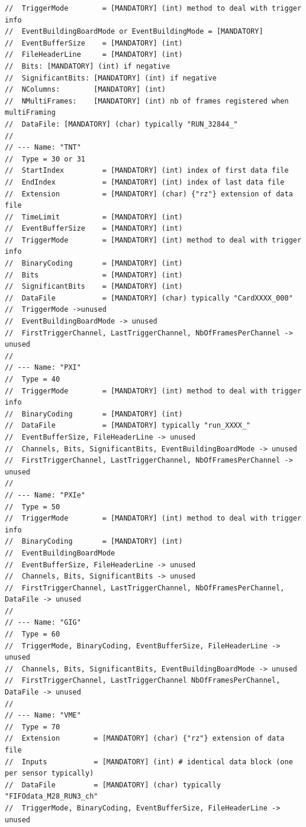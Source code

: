 \documentclass[a4paper, 12pt, twoside]{article}
\begin{document}
\begin{verbatim}
//  TriggerMode        = [MANDATORY] (int) method to deal with trigger info
//  EventBuildingBoardMode or EventBuildingMode = [MANDATORY]
//  EventBufferSize    = [MANDATORY] (int)
//  FileHeaderLine     = [MANDATORY] (int)
//  Bits: [MANDATORY] (int) if negative
//  SignificantBits: [MANDATORY] (int) if negative
//  NColumns:        [MANDATORY] (int)
//  NMultiFrames:    [MANDATORY] (int) nb of frames registered when multiFraming
//  DataFile: [MANDATORY] (char) typically "RUN_32844_"
//
// --- Name: "TNT"
//  Type = 30 or 31
//  StartIndex         = [MANDATORY] (int) index of first data file
//  EndIndex           = [MANDATORY] (int) index of last data file
//  Extension          = [MANDATORY] (char) {"rz"} extension of data file
//  TimeLimit          = [MANDATORY] (int)
//  EventBufferSize    = [MANDATORY] (int)
//  TriggerMode        = [MANDATORY] (int) method to deal with trigger info
//  BinaryCoding       = [MANDATORY] (int)
//  Bits               = [MANDATORY] (int)
//  SignificantBits    = [MANDATORY] (int)
//  DataFile           = [MANDATORY] (char) typically "CardXXXX_000"
//  TriggerMode ->unused
//  EventBuildingBoardMode -> unused
//  FirstTriggerChannel, LastTriggerChannel, NbOfFramesPerChannel -> unused
//
// --- Name: "PXI"
//  Type = 40
//  TriggerMode        = [MANDATORY] (int) method to deal with trigger info
//  BinaryCoding       = [MANDATORY] (int)
//  DataFile           = [MANDATORY] typically "run_XXXX_"
//  EventBufferSize, FileHeaderLine -> unused
//  Channels, Bits, SignificantBits, EventBuildingBoardMode -> unused
//  FirstTriggerChannel, LastTriggerChannel, NbOfFramesPerChannel -> unused
//
// --- Name: "PXIe"
//  Type = 50
//  TriggerMode        = [MANDATORY] (int) method to deal with trigger info
//  BinaryCoding       = [MANDATORY] (int)
//  EventBuildingBoardMode
//  EventBufferSize, FileHeaderLine -> unused
//  Channels, Bits, SignificantBits -> unused
//  FirstTriggerChannel, LastTriggerChannel, NbOfFramesPerChannel, DataFile -> unused
//
// --- Name: "GIG"
//  Type = 60
//  TriggerMode, BinaryCoding, EventBufferSize, FileHeaderLine -> unused
//  Channels, Bits, SignificantBits, EventBuildingBoardMode -> unused
//  FirstTriggerChannel, LastTriggerChannel NbOfFramesPerChannel, DataFile -> unused
//
// --- Name: "VME"
//  Type = 70
//  Extension        = [MANDATORY] (char) {"rz"} extension of data file
//  Inputs           = [MANDATORY] (int) # identical data block (one per sensor typically)
//  DataFile         = [MANDATORY] (char) typically "FIFOdata_M28_RUN3_ch"
//  TriggerMode, BinaryCoding, EventBufferSize, FileHeaderLine -> unused

\end{verbatim}
\end{document}
